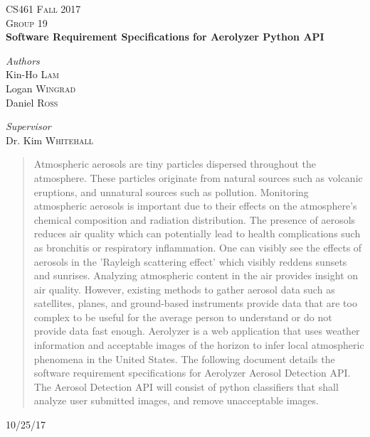 \documentclass[journal,10pt,draftclsnofoot,onecolumn]{IEEEtran}
\begin{document}
\begin{titlepage}
\newcommand{\HRule}{\rule{\linewidth}{0.4mm}}

\center

\textsc{\Large CS461 Fall 2017 }\\[0.5cm]
\textsc{\large Group 19}\\[0.5cm] %

{\huge\bfseries Software Requirement Specifications for Aerolyzer Python API}\\[0.4cm]

\vfill
\begin{minipage}{0.4\textwidth}
\begin{flushleft}
\large
\textit{Authors}\\
Kin-Ho \textsc{Lam}\\
Logan \textsc{Wingrad}\\
Daniel \textsc{Ross}\\
\end{flushleft}
\end{minipage}
\vfill
\begin{minipage}{0.4\textwidth}
\begin{flushleft}
\large
\textit{Supervisor}\\
Dr. Kim \textsc{Whitehall}
\end{flushleft}
\end{minipage}

\vfill

\begin{abstract}
Atmospheric aerosols are tiny particles dispersed throughout the atmosphere.
These particles originate from natural sources such as volcanic eruptions, and unnatural sources such as pollution. 
Monitoring atmospheric aerosols is important due to their effects on the atmosphere's chemical composition and radiation distribution.
The presence of aerosols reduces air quality which can potentially lead to health complications such as bronchitis or respiratory inflammation.
One can visibly see the effects of aerosols in the 'Rayleigh scattering effect' which visibly reddens sunsets and sunrises.
Analyzing atmospheric content in the air provides insight on air quality. 
However, existing methods to gather aerosol data such as satellites, planes, and ground-based instruments provide data that are too complex to be useful for the average person to understand or do not provide data fast enough.
Aerolyzer is a web application that uses weather information and acceptable images of the horizon to infer local atmospheric phenomena in the United States. 
The following document details the software requirement specifications for Aerolyzer Aerosol Detection API. The Aerosol Detection API will consist of  python classifiers that shall analyze user submitted images, and remove unacceptable images.
\end{abstract}

\vfill
\vfill
\vfill
{\large10/25/17}
\vfill
\end{titlepage}
\end{document}
